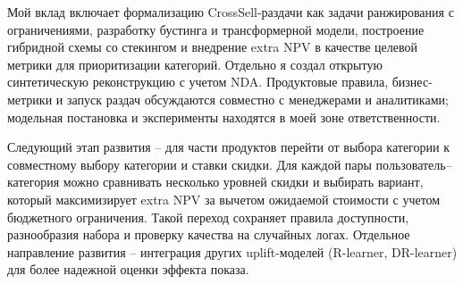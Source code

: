 \documentclass[11pt,a4paper]{article}
\begin{document}
Мой вклад включает формализацию CrossSell-раздачи как задачи ранжирования с ограничениями, разработку бустинга и трансформерной модели, построение гибридной схемы со стекингом и внедрение extra NPV в качестве целевой метрики для приоритизации категорий. Отдельно я создал открытую синтетическую реконструкцию с учетом NDA. Продуктовые правила, бизнес-метрики и запуск раздач обсуждаются совместно с менеджерами и аналитиками; модельная постановка и эксперименты находятся в моей зоне ответственности.

Следующий этап развития -- для части продуктов перейти от выбора категории к совместному выбору категории и ставки скидки. Для каждой пары пользователь--категория можно сравнивать несколько уровней скидки и выбирать вариант, который максимизирует extra NPV за вычетом ожидаемой стоимости с учетом бюджетного ограничения. Такой переход сохраняет правила доступности, разнообразия набора и проверку качества на случайных логах. Отдельное направление развития -- интеграция других uplift-моделей (R-learner, DR-learner) для более надежной оценки эффекта показа.
\end{document}
